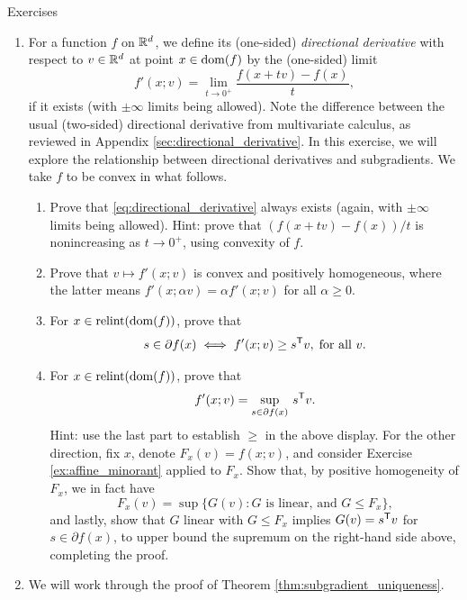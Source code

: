 \begin{xcb}{Exercises}
\begin{enumerate}[label=\thechapter.\arabic*]
\item \label{ex:directional_derivative}
  For a function $f$ on $\mathbb{R}^d$, we define its (one-sided) \emph{directional
    derivative} with respect to $v \in \mathbb{R}^d$ at point $x \in \operatorname{dom}(f)$ by the
  (one-sided) limit  
  \begin{equation}
  \label{eq:directional_derivative}
  f'(x; v) = \lim_{t \to 0^+} \frac{f(x + tv) - f(x)}{t},
  \end{equation}
  if it exists (with $\pm \infty$ limits being allowed). Note the difference
  between the usual (two-sided) directional derivative from multivariate
  calculus, as reviewed in Appendix \ref{sec:directional_derivative}. In this
  exercise, we will explore the relationship between directional derivatives and
  subgradients. We take $f$ to be convex in what follows.

\begin{enumerate}[label=\alph*.]
\item Prove that \eqref{eq:directional_derivative} always exists (again, with
  $\pm \infty$ limits being allowed). Hint: prove that $(f(x + tv) - f(x)) / t$
  is nonincreasing as $t \to 0^+$, using convexity of 
  $f$.     

\item Prove that $v \mapsto f'(x; v)$ is convex and positively homogeneous,
  where the latter means $f'(x; \alpha v) = \alpha f'(x; v)$ for all $\alpha
  \geq 0$. 

\item For $x \in \operatorname{relint}(\operatorname{dom}(f))$, prove that 
  \[
  s \in \partial f(x) \iff f'(x; v) \geq s^{\mathsf{T}} v, \; \text{for all $v$}.
  \]

\item For $x \in \operatorname{relint}(\operatorname{dom}(f))$, prove that 
  \[
  f'(x; v) = \sup_{s \in \partial f(x)} \, s^{\mathsf{T}} v.
  \]
  Hint: use the last part to establish $\geq$ in the above display. For the
  other direction, fix $x$, denote $F_x(v) = f(x; v)$, and consider Exercise
  \ref{ex:affine_minorant} applied to $F_x$. Show that, by positive homogeneity
  of $F_x$, we in fact have
  \[
  F_x(v) = \sup \{ G(v) : \text{$G$ is linear, and $G \leq F_x$} \},
  \]
  and lastly, show that $G$ linear with $G \leq F_x$ implies $G(v) = s^{\mathsf{T}} v$ for
  $s \in \partial f(x)$, to upper bound the supremum on the right-hand side
  above, completing the proof. 
\end{enumerate}

\item \label{ex:subgradient_uniqueness}
  We will work through the proof of Theorem \ref{thm:subgradient_uniqueness}.  


\end{enumerate}
\end{xcb}
